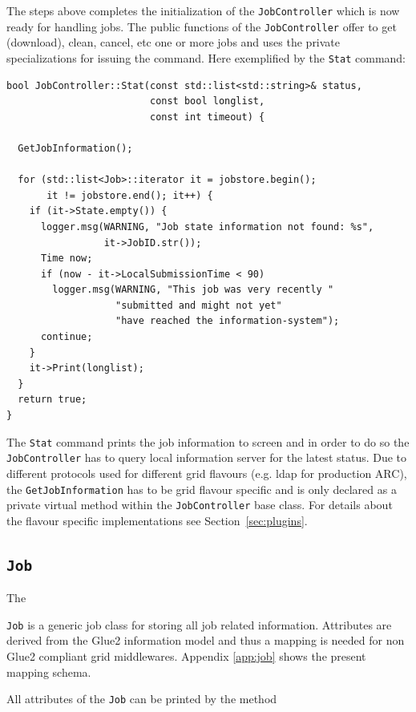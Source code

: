 \documentclass{book}
\newcommand{\Job}{\texttt{Job}}
\newcommand{\JobController}{\texttt{JobController}}
\begin{document}
The steps above completes the initialization of the {\JobController}
which is now ready for handling jobs. The public functions of the
{\JobController} offer to get (download), clean, cancel, etc one or
more jobs and uses the private specializations for issuing the
command. Here exemplified by the \texttt{Stat} command:

\begin{shaded}
\begin{small}
\begin{verbatim}
bool JobController::Stat(const std::list<std::string>& status,
                         const bool longlist,
                         const int timeout) {

  GetJobInformation();

  for (std::list<Job>::iterator it = jobstore.begin();
       it != jobstore.end(); it++) {
    if (it->State.empty()) {
      logger.msg(WARNING, "Job state information not found: %s",
                 it->JobID.str());
      Time now;
      if (now - it->LocalSubmissionTime < 90)
        logger.msg(WARNING, "This job was very recently "
                   "submitted and might not yet"
                   "have reached the information-system");
      continue;
    }
    it->Print(longlist);
  }
  return true;
}
\end{verbatim}
\end{small}
\end{shaded}

The \texttt{Stat} command prints the job information to screen and in
order to do so the {\JobController} has to query local information
server for the latest status. Due to different protocols used for
different grid flavours (e.g. ldap for production ARC), the
\texttt{GetJobInformation} has to be grid flavour specific and is only
declared as a private virtual method within the {\JobController} base
class. For details about the flavour specific implementations see
Section~\ref{sec:plugins}.

\subsection{{\Job}} The

{\Job} is a generic job class for storing all job related information.
Attributes are derived from the Glue2 information model and thus a
mapping is needed for non Glue2 compliant grid middlewares. Appendix
\ref{app:job} shows the present mapping schema.

All attributes of the {\Job} can be printed by the method
\end{document}
